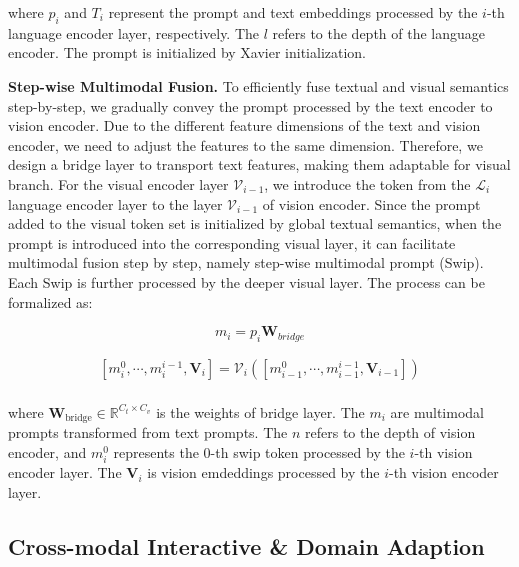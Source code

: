 \noindent
where $p_i$ and \bm ${T}_{i}$ represent the prompt and text embeddings processed by the $i$-th language encoder layer, respectively. The $l$ refers to the depth of the language encoder. The prompt is initialized by Xavier initialization.

\noindent
\textbf{Step-wise Multimodal Fusion.}
To efficiently fuse textual and visual semantics step-by-step, we gradually convey the prompt processed by the text encoder to vision encoder.
Due to the different feature dimensions of the text and vision encoder, we need to adjust the features to the same dimension. Therefore, we design a bridge layer to transport text features, making them adaptable for visual branch. For the visual encoder layer $\mathcal{V}_{i-1}$, we introduce the token from the $\mathcal{L}_{i}$ language encoder layer to the layer $\mathcal{V}_{i-1}$ of vision encoder. Since the prompt added to the visual token set is initialized by global textual semantics, when the prompt is introduced into the corresponding visual layer, it can facilitate multimodal fusion step by step, namely step-wise multimodal prompt (Swip). Each Swip is further processed by the deeper visual layer. The process can be formalized as:


\begin{equation}
m_i = p_i\mathbf{W}_{bridge}
\end{equation}

\noindent



\begin{equation}
\begin{aligned}
[m_{i}^0,\cdots,m_{i}^{i-1}, \bm V_{i}] = \mathcal{V}_{i}([m_{i-1}^0,\cdots,m_{i-1}^{i-1},\bm V_{i-1}]) \\
\end{aligned}
\end{equation}


\noindent
where $\mathbf{W}_{\text{bridge}} \in \mathbb{R}^{C_t \times C_v}$ is the weights of bridge layer. The $m_i$ are multimodal prompts transformed from text prompts. The $n$ refers to the depth of vision encoder, and $m_i^{0}$ represents the $0$-th swip token processed by the $i$-th vision encoder layer. The $\bm V_{i}$ is vision emdeddings processed by the $i$-th vision encoder layer.


\subsection{Cross-modal Interactive \& Domain Adaption}

